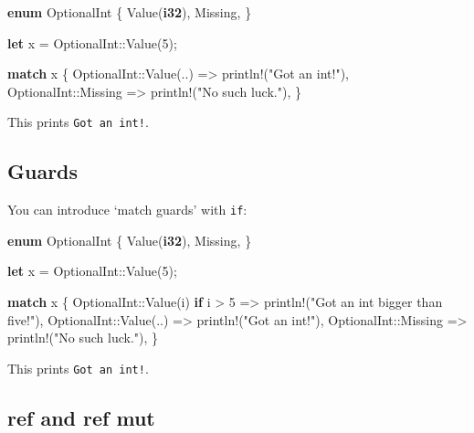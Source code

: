 \documentclass[a4paper,]{book}
\newenvironment{Shaded}{\begin{snugshade}}{\end{snugshade}}
\newcommand{\KeywordTok}[1]{\textcolor[rgb]{0.13,0.29,0.53}{\textbf{{#1}}}}
\newcommand{\DecValTok}[1]{\textcolor[rgb]{0.00,0.00,0.81}{{#1}}}
\newcommand{\StringTok}[1]{\textcolor[rgb]{0.31,0.60,0.02}{{#1}}}
\newcommand{\OtherTok}[1]{\textcolor[rgb]{0.56,0.35,0.01}{{#1}}}
\newcommand{\NormalTok}[1]{{#1}}
\begin{document}
\begin{Shaded}
\begin{Highlighting}[]
\KeywordTok{enum} \NormalTok{OptionalInt \{}
    \NormalTok{Value(}\KeywordTok{i32}\NormalTok{),}
    \NormalTok{Missing,}
\NormalTok{\}}

\KeywordTok{let} \NormalTok{x = OptionalInt::Value(}\DecValTok{5}\NormalTok{);}

\KeywordTok{match} \NormalTok{x \{}
    \NormalTok{OptionalInt::Value(..) => }\OtherTok{println!}\NormalTok{(}\StringTok{"Got an int!"}\NormalTok{),}
    \NormalTok{OptionalInt::Missing => }\OtherTok{println!}\NormalTok{(}\StringTok{"No such luck."}\NormalTok{),}
\NormalTok{\}}
\end{Highlighting}
\end{Shaded}

This prints \texttt{Got\ an\ int!}.

\subsection{Guards}\label{guards}

You can introduce `match guards' with \texttt{if}:

\begin{Shaded}
\begin{Highlighting}[]
\KeywordTok{enum} \NormalTok{OptionalInt \{}
    \NormalTok{Value(}\KeywordTok{i32}\NormalTok{),}
    \NormalTok{Missing,}
\NormalTok{\}}

\KeywordTok{let} \NormalTok{x = OptionalInt::Value(}\DecValTok{5}\NormalTok{);}

\KeywordTok{match} \NormalTok{x \{}
    \NormalTok{OptionalInt::Value(i) }\KeywordTok{if} \NormalTok{i > }\DecValTok{5} \NormalTok{=> }\OtherTok{println!}\NormalTok{(}\StringTok{"Got an int bigger than five!"}\NormalTok{),}
    \NormalTok{OptionalInt::Value(..) => }\OtherTok{println!}\NormalTok{(}\StringTok{"Got an int!"}\NormalTok{),}
    \NormalTok{OptionalInt::Missing => }\OtherTok{println!}\NormalTok{(}\StringTok{"No such luck."}\NormalTok{),}
\NormalTok{\}}
\end{Highlighting}
\end{Shaded}

This prints \texttt{Got\ an\ int!}.

\subsection{ref and ref mut}\label{ref-and-ref-mut}
\end{document}
